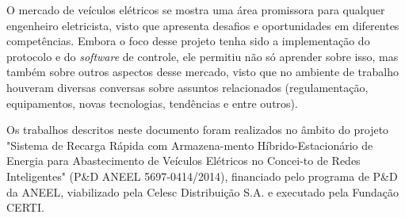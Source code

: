   O mercado de veículos elétricos se mostra uma área promissora para qualquer engenheiro eletricista, visto que apresenta desafios e oportunidades em diferentes competências. Embora o foco desse projeto tenha sido a implementação do protocolo e do \textit{software} de controle, ele permitiu não só aprender sobre isso, mas também sobre outros aspectos desse mercado, visto que no ambiente de trabalho houveram diversas conversas sobre assuntos relacionados (regulamentação, equipamentos, novas tecnologias, tendências e entre outros).

  Os trabalhos descritos neste documento foram realizados no âmbito do projeto "Sistema de Recarga Rápida com Armazena-mento Híbrido-Estacionário de Energia para Abastecimento de Veículos Elétricos no Concei-to de Redes Inteligentes" (P\&D ANEEL 5697-0414/2014), financiado pelo programa de P\&D da ANEEL, viabilizado pela Celesc Distribuição S.A. e executado pela Fundação CERTI.
  